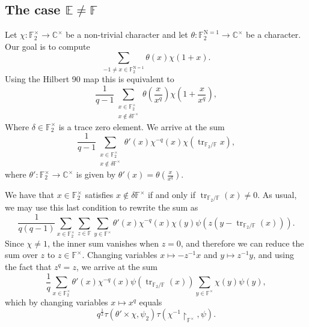 \documentclass[12pt, reqno]{amsart}
\theoremstyle{definition}
\theoremstyle{definition}
\theoremstyle{definition}
\newcommand{\cComplex}{\mathbb{C}}
\newcommand{\multiplicativegroup}[1]{#1^{\times}}
\newcommand{\fieldCharacter}{\psi}
\newcommand{\trace}{\operatorname{tr}}
\newcommand{\aFieldNorm}{\mathrm{N}}
\newcommand{\finiteField}{\mathbb{F}}
\newcommand{\quadraticExtension}{\mathbb{E}}
\newcommand{\finiteFieldExtension}[1]{\finiteField_{#1}}
\newcommand{\NormOneGroup}[1]{\finiteFieldExtension{#1}^{\aFieldNorm = 1}}
\newcommand{\GaussSumCharacter}[3]{\tau\left(#1 \times #2, #3\right)}
\begin{document}
\subsection{The case $\quadraticExtension \ne \finiteField$}
Let $\chi \colon \multiplicativegroup{\finiteFieldExtension{2}} \to \multiplicativegroup{\cComplex}$ be a non-trivial character and let $\theta \colon \NormOneGroup{2} \to \multiplicativegroup{\cComplex}$ be a character. Our goal is to compute $$\sum_{-1 \ne x \in \NormOneGroup{2}} \theta\left(x\right) \chi\left(1+x\right).$$
Using the Hilbert 90 map this is equivalent to
$$\frac{1}{q-1} \sum_{\substack{x \in \multiplicativegroup{\finiteFieldExtension{2}}\\
x \notin \delta \multiplicativegroup{\finiteField}}} \theta\left(\frac{x}{x^q}\right) \chi\left(1+\frac{x}{x^q}\right),$$
Where $\delta \in \multiplicativegroup{\finiteFieldExtension{2}}$ is a trace zero element. 
We arrive at the sum
$$\frac{1}{q-1} \sum_{\substack{x \in \multiplicativegroup{\finiteFieldExtension{2}}\\
		x \notin \delta \multiplicativegroup{\finiteField}}} \theta'\left(x\right) \chi^{-q}\left(x\right) \chi\left(\trace_{\finiteFieldExtension{2} \slash \finiteField} x\right),$$
	where $\theta' \colon \multiplicativegroup{\finiteFieldExtension{2}} \to \multiplicativegroup{\cComplex}$ is given by $\theta'\left(x\right) = \theta\left(\frac{x}{x^q}\right)$.
	
	We have that $x \in \multiplicativegroup{\finiteFieldExtension{2}}$ satisfies $x \notin \delta \multiplicativegroup{\finiteField}$ if and only if $\trace_{\finiteFieldExtension{2} \slash \finiteField}\left(x\right) \ne 0$. As usual, we may use this last condition to rewrite the sum as
	$$\frac{1}{q\left(q-1\right)} \sum_{x \in \multiplicativegroup{\finiteFieldExtension{2}}}\sum_{z \in \finiteField} \sum_{y \in \multiplicativegroup{\finiteField}}  \theta'\left(x\right) \chi^{-q}\left(x\right) \chi\left(y\right) \fieldCharacter\left(z\left(y - \trace_{\finiteFieldExtension{2} \slash \finiteField} \left(x\right)\right)\right).$$
	Since $\chi \ne 1$, the inner sum vanishes when $z = 0$, and therefore we can reduce the sum over $z$ to $z \in \multiplicativegroup{\finiteField}$. Changing variables $x \mapsto -z^{-1} x$ and $y \mapsto z^{-1} y$, and using the fact that $z^q = z$, we arrive at the sum
	$$\frac{1}{q} \sum_{x \in \multiplicativegroup{\finiteFieldExtension{2}}}\theta'\left(x\right)  \chi^{-q}\left(x\right) \fieldCharacter\left(\trace_{\finiteFieldExtension{2} \slash \finiteField} \left(x\right)\right) \sum_{y \in \multiplicativegroup{\finiteField}}   \chi\left(y\right) \fieldCharacter\left(y\right),$$
	which by changing variables $x \mapsto x^q$ equals
	$$q^{\frac{1}{2}} \GaussSumCharacter{\theta'}{\chi}{\fieldCharacter_{2}} \tau\left(\chi^{-1} \restriction_{\multiplicativegroup{\finiteField}}, \fieldCharacter\right).$$



\end{document}
